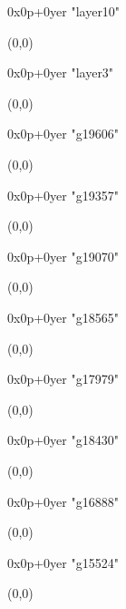    0x0p+0yer "layer10"
  \begin{textblock}{1}(0,0)
  \end{textblock}

   0x0p+0yer "layer3"
  \begin{textblock}{1}(0,0)
  \end{textblock}

   0x0p+0yer "g19606"
  \begin{textblock}{1}(0,0)
  \end{textblock}

   0x0p+0yer "g19357"
  \begin{textblock}{1}(0,0)
  \end{textblock}

   0x0p+0yer "g19070"
  \begin{textblock}{1}(0,0)
  \end{textblock}

   0x0p+0yer "g18565"
  \begin{textblock}{1}(0,0)
  \end{textblock}

   0x0p+0yer "g17979"
  \begin{textblock}{1}(0,0)
  \end{textblock}

   0x0p+0yer "g18430"
  \begin{textblock}{1}(0,0)
  \end{textblock}

   0x0p+0yer "g16888"
  \begin{textblock}{1}(0,0)
  \end{textblock}

   0x0p+0yer "g15524"
  \begin{textblock}{1}(0,0)
  \end{textblock}

